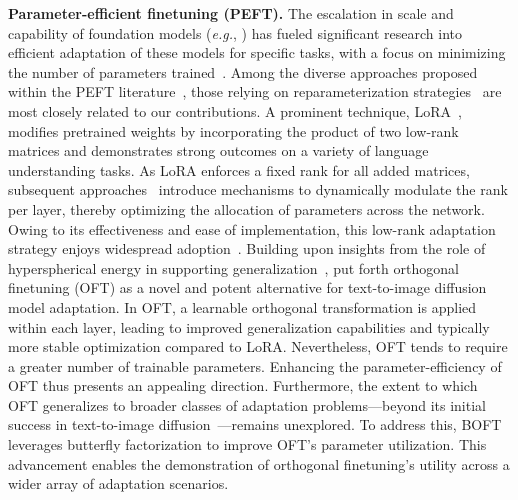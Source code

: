 \textbf{Parameter-efficient finetuning (PEFT).} The escalation in scale and capability of foundation models (\emph{e.g.}, \cite{brown2020language,radford2021learning,rombach2022high,kirillov2023segment}) has fueled significant research into efficient adaptation of these models for specific tasks, with a focus on minimizing the number of parameters trained~\cite{treviso2023efficient,ding2023parameter,lialin2023scaling}. Among the diverse approaches proposed within the PEFT literature~\cite{houlsby2019parameter,aghajanyan2020intrinsic,hulora2022,edalati2022krona,wang2022adamix,gheini2021cross,zaken2022bitfit,guo2020parameter,sung2021training,ansell2022composable,lester2021power,li2021prefix,vu2022spot,he2021towards,mao2021unipelt,karimi2021compacter,liu2022few,sung2022lst,chen2022parameter,jia2022visual,chen2022adaptformer,zhang2022neural,jie2023fact,lian2022scaling,luo2023towards}, those relying on reparameterization strategies~\cite{aghajanyan2020intrinsic,hulora2022,edalati2022krona} are most closely related to our contributions. A prominent technique, LoRA~\cite{hulora2022}, modifies pretrained weights by incorporating the product of two low-rank matrices and demonstrates strong outcomes on a variety of language understanding tasks. As LoRA enforces a fixed rank for all added matrices, subsequent approaches~\cite{zhang2022adaptive,valipour2022dylora,zhang2023increlora} introduce mechanisms to dynamically modulate the rank per layer, thereby optimizing the allocation of parameters across the network. Owing to its effectiveness and ease of implementation, this low-rank adaptation strategy enjoys widespread adoption~\cite{dettmers2023qlora,zi2023delta,chavan2023one}. Building upon insights from the role of hyperspherical energy in supporting generalization~\cite{liu2018learning,liu2021orthogonal}, \cite{qiu2023controlling} put forth orthogonal finetuning (OFT) as a novel and potent alternative for text-to-image diffusion model adaptation. In OFT, a learnable orthogonal transformation is applied within each layer, leading to improved generalization capabilities and typically more stable optimization compared to LoRA. Nevertheless, OFT tends to require a greater number of trainable parameters. Enhancing the parameter-efficiency of OFT thus presents an appealing direction. Furthermore, the extent to which OFT generalizes to broader classes of adaptation problems—beyond its initial success in text-to-image diffusion~\cite{qiu2023controlling}—remains unexplored. To address this, BOFT leverages butterfly factorization to improve OFT's parameter utilization. This advancement enables the demonstration of orthogonal finetuning's utility across a wider array of adaptation scenarios.

